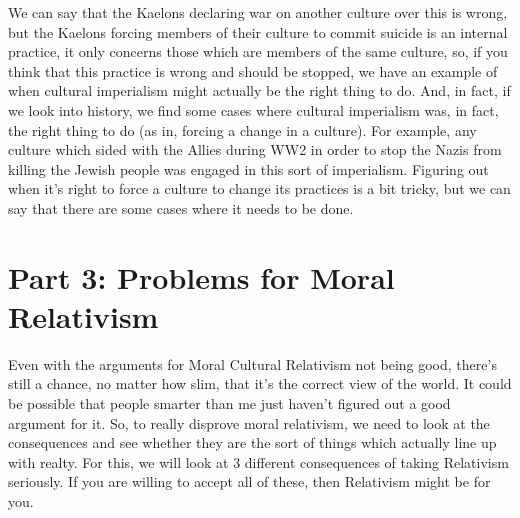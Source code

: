 
We can say that the Kaelons declaring war on another culture over this is wrong, but the Kaelons forcing members of their culture to commit suicide is an internal practice, it only concerns those which are members of the same culture, so, if you think that this practice is wrong and should be stopped, we have an example of when cultural imperialism might actually be the right thing to do.  And, in fact, if we look into history, we find some cases where cultural imperialism was, in fact, the right thing to do (as in, forcing a change in a culture). For example, any culture which sided with the Allies during WW2 in order to stop the Nazis from killing the Jewish people was engaged in this sort of imperialism.  Figuring out when it's right to force a culture to change its practices is a bit tricky, but we can say that there are some cases where it needs to be done. 

\chapter{Part 3: Problems for Moral Relativism}

Even with the arguments for Moral Cultural Relativism not being good, there's still a chance, no matter how slim, that it's the correct view of the world. It could be possible that people smarter than me just haven't figured out a good argument for it. So, to really disprove moral relativism, we need to look at the consequences and see whether they are the sort of things which actually line up with realty. For this, we will look at 3 different consequences of taking Relativism seriously. If you are willing to accept all of these, then Relativism might be for you.

